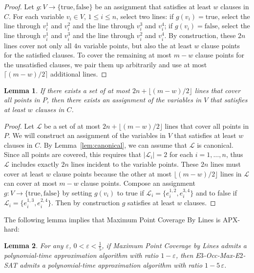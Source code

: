 \documentclass[letterpaper,11pt]{article}
\newtheorem{lemma}{Lemma}
\def\L{{\mathcal L}}
\newcommand{\eps}{\varepsilon}
\begin{document}
\begin{proof}
Let $g:V \to \{\textrm{true}, \textrm{false}\}$
be an assignment that satisfies at least $w$ clauses in $C$.
For each variable $v_i \in V$, $1 \le i \le n$,
select two lines:
if $g(v_i) = \textrm{true}$,
select the line through $v_i^1$ and $v_i^2$
and the line through $v_i^3$ and $v_i^4$;
if $g(v_i) = \textrm{false}$,
select the line through $v_i^1$ and $v_i^3$
and the line through $v_i^2$ and $v_i^4$.
By construction,
these $2n$ lines cover not only all $4n$ variable points,
but also the at least $w$ clause points for the satisfied clauses.
To cover the remaining at most $m - w$ clause points
for the unsatisfied clauses,
we pair them up arbitrarily and use at most $\lceil (m - w) / 2 \rceil$
additional lines.
\end{proof}

\begin{lemma}\label{lem:min-reverse}
If there exists a set of at most $2n + \lfloor (m - w) / 2 \rfloor$ lines
that cover all points in $P$,
then there exists an assignment of the variables in $V$
that satisfies at least $w$ clauses in $C$.
\end{lemma}

\begin{proof}
Let $\L$ be a set of at most
$2n + \lfloor (m - w) / 2 \rfloor$ lines that cover all points in $P$.
We will construct an assignment of the variables in $V$
that satisfies at least $w$ clauses in $C$.
By Lemma~\ref{lem:canonical}, we can assume that $\L$ is canonical.
Since all points are covered, this requires that $|\L_i| = 2$ for each
$i=1,\ldots,n$, thus $\L$ includes exactly $2n$ lines incident to the
variable points. 
These $2n$ lines must cover at least $w$ clause points
because the other at most $\lfloor (m-w)/2 \rfloor$ lines in $\L$ can
cover at most $m - w$ clause points.
Compose an assignment
$g:V \to \{\textrm{true}, \textrm{false}\}$
by setting $g(v_i)$ to true if $\L_i = \{e_i^{1,2},e_i^{3,4}\}$
and to false if $\L_i = \{e_i^{1,3},e_i^{2,4}\}$.
Then  by construction $g$ satisfies at least $w$ clauses.
\end{proof}

The following lemma implies that {\sc Maximum Point Coverage By Lines} is APX-hard:

\begin{lemma}\label{lem:max}
For any $\eps$, $0 < \eps < \frac15$,
if {\sc Maximum Point Coverage by Lines} admits a polynomial-time approximation algorithm
with ratio $1 - \eps$,
then {\sc E$3$-Occ-Max-E$2$-SAT} admits a polynomial-time approximation algorithm
with ratio $1 - 5\,\eps$.
\end{lemma}
\end{document}
